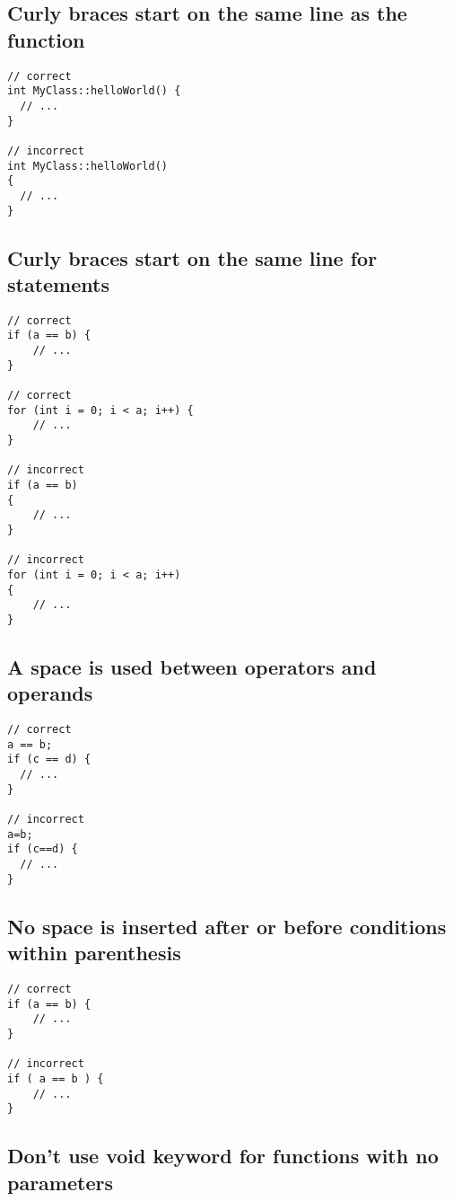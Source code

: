 \subsection{Curly braces start on the same line as the function}

\begin{verbatim}
// correct
int MyClass::helloWorld() {
  // ...
}

// incorrect
int MyClass::helloWorld()
{
  // ...
}
\end{verbatim}

\subsection{Curly braces start on the same line for statements}

\begin{verbatim}
// correct
if (a == b) {
    // ...
}

// correct
for (int i = 0; i < a; i++) {
    // ...
}

// incorrect
if (a == b)
{
    // ...
}

// incorrect
for (int i = 0; i < a; i++)
{
    // ...
}
\end{verbatim}

\subsection{A space is used between operators and operands}

\begin{verbatim}
// correct
a == b;
if (c == d) {
  // ...
}

// incorrect
a=b;
if (c==d) {
  // ...
}
\end{verbatim}

\subsection{No space is inserted after or before conditions within parenthesis}

\begin{verbatim}
// correct
if (a == b) {
    // ...
}

// incorrect
if ( a == b ) {
    // ...
}
\end{verbatim}

\subsection{Don't use void keyword for functions with no parameters}

